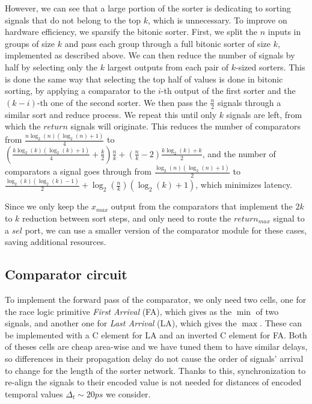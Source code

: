 \documentclass{article}
\begin{document}
However, we can see that a large portion of the sorter is
dedicating to sorting signals that do not belong to the top
$k$, which is unnecessary. To improve on hardware
efficiency, we sparsify the bitonic sorter. First, we split
the $n$ inputs in groups of size $k$ and pass each group
through a full bitonic sorter of size $k$, implemented as
described above. We can then reduce the number of signals by
half by selecting only the $k$ largest outputs from each
pair of $k$-sized sorters. This is done the same way that
selecting the top half of values is done in bitonic sorting,
by applying a comparator to the $i$-th output of the first
sorter and the $(k-i)$-th one of the second sorter. We then
pass the $\frac{n}{2}$ signals through a similar sort and
reduce process. We repeat this until only $k$ signals are
left, from which the $return$ signals will originate. This
reduces the number of comparators from $\frac{n \log_2(n)
(\log_2(n)+1)}{4}$ to $(\frac{k \log_2(k) (\log_2(k)+1)}{4} +\frac{k}{2}) \frac{n}{k}+(\frac{n}{k}-2)\frac{k \log_2(k) + k}{2}$, and the number
of comparators a signal goes through from $\frac{\log_2(n)
(\log_2(n)+1)}{2}$ to $\frac{\log_2(k) (\log_2(k)-1)}{2} + \log_2(\frac{n}{k})(\log_2(k) + 1)$, which minimizes
latency.

Since we only keep the $x_{max}$ output from the comparators
that implement the $2k$ to $k$ reduction between sort steps,
and only need to route the $return_{max}$ signal to a $sel$
port, we can use a smaller version of the comparator module
for these cases, saving additional resources.

\subsection{Comparator circuit}

To implement the forward pass of the comparator, we only
need two cells, one for the race logic primitive
\textit{First Arrival} (FA), which gives as the $\min$ of
two signals, and another one for \textit{Last Arrival} (LA),
which gives the $\max$. These can be implemented with a C
element for LA and an inverted C element for FA. Both of
theses cells are cheap area-wise and we have tuned them to
have similar delays, so differences in their propagation
delay do not cause the order of signals' arrival to change
for the length of the sorter network. Thanks to this,
synchronization to re-align the signals to their encoded
value is not needed for distances of encoded temporal values
$\Delta_t \sim 20ps$ we consider.
\end{document}

